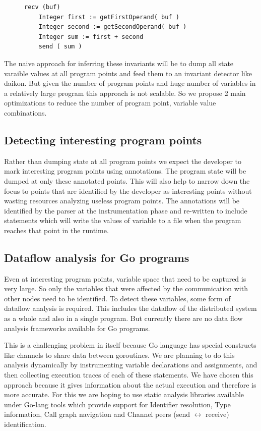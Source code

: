 \begin{figure}
\begin{lstlisting}[caption={Sample code for Communication between 2 nodes - Node 1}, label=lst:node1]
    recv (buf)
    Integer first := getFirstOperand( buf )
    Integer second := getSecondOperand( buf )
    Integer sum := first + second
    send ( sum )
\end{lstlisting}
\end{figure}

The naive approach for inferring these invariants will be to dump all
state varaible values at all program points and feed them to an
invariant detector like daikon\cite{ernst2007daikon}. But given the
number of program points and huge number of variables in a relatively
large program this approach is not scalable. So we propose 2 main
optimizations to reduce the number of program point, variable value
combinations.

\subsection{Detecting interesting program points}

Rather than dumping state at all program points we expect the
developer to mark interesting program points using annotations. The
program state will be dumped at only these annotated points. This will
also help to narrow down the focus to points that are identified by
the developer as interesting points without wasting resources
analyzing useless program points. The annotations will be identified
by the parser at the instrumentation phase and re-written to include
statements which will write the values of variable to a file when the
program reaches that point in the runtime.

\subsection{Dataflow analysis for Go programs}

Even at interesting program points, variable space that need to be
captured is very large. So only the variables that were affected by
the communication with other nodes need to be identified. To detect
these variables, some form of dataflow analysis is required. This
includes the dataflow of the distributed system as a whole and also in
a single program. But currently there are no data flow analysis
frameworks available for Go programs.

This is a challenging problem in itself because Go language has
special constructs like channels to share data between goroutines. We
are planning to do this analysis dynamically by instrumenting variable
declarations and assignments, and then collecting execution traces of
each of these statements. We have chosen this approach because it
gives information about the actual execution and therefore is more
accurate. For this we are hoping to use static analysis libraries
available under Go-lang tools\cite{static_golang} which provide
support for Identifier resolution, Type information, Call graph
navigation and Channel peers (send $\leftrightarrow$ receive)
identification.

